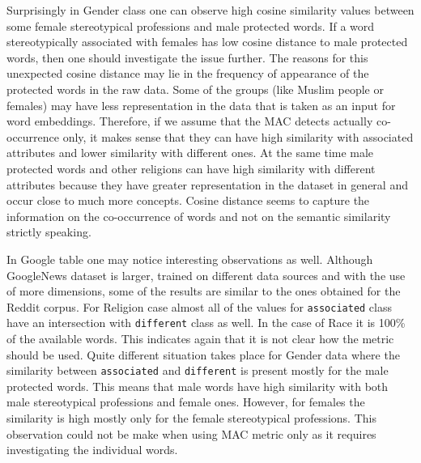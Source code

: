 \documentclass[
  12pt,
]{book}
\begin{document}
Surprisingly in Gender class one can observe high cosine similarity values between some female stereotypical professions and male protected words. If a word stereotypically associated with females has low cosine distance to male protected words, then one should investigate the issue further. The reasons for this unexpected cosine distance may lie in the frequency of appearance of the protected words in the raw data. Some of the groups (like Muslim people or females) may have less representation in the data that is taken as an input for word embeddings. Therefore, if we assume that the MAC detects actually co-occurrence only, it makes sense that they can have high similarity with associated attributes and lower similarity with different ones. At the same time male protected words and other religions can have high similarity with different attributes because they have greater representation in the dataset in general and occur close to much more concepts. Cosine distance seems to capture the information on the co-occurrence of words and not on the semantic similarity strictly speaking.

In Google table one may notice interesting observations as well. Although GoogleNews dataset is larger, trained on different data sources and with the use of more dimensions, some of the results are similar to the ones obtained for the Reddit corpus. For Religion case almost all of the values for \texttt{associated} class have an intersection with \texttt{different} class as well. In the case of Race it is 100\% of the available words. This indicates again that it is not clear how the metric should be used. Quite different situation takes place for Gender data where the similarity between \texttt{associated} and \texttt{different} is present mostly for the male protected words. This means that male words have high similarity with both male stereotypical professions and female ones. However, for females the similarity is high mostly only for the female stereotypical professions. This observation could not be make when using MAC metric only as it requires investigating the individual words.
\end{document}

